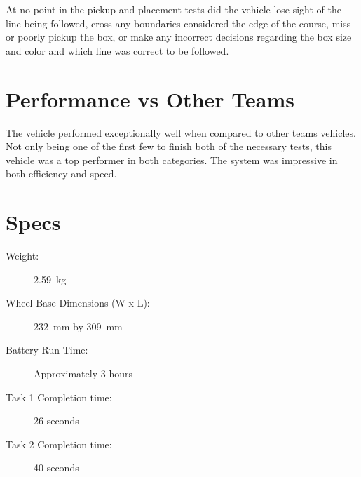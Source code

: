 \documentclass[11pt]{report}
\begin{document}
At no point in the pickup and placement tests did the vehicle lose sight of the line being followed, cross any boundaries considered the edge of the course, miss or poorly pickup the box, or make any incorrect decisions regarding the box size and color and which line was correct to be followed. 
\section{Performance vs Other Teams}
The vehicle performed exceptionally well when compared to other teams vehicles. Not only being one of the first few to finish both of the necessary tests, this vehicle was a top performer in both categories. The system was impressive in both efficiency and speed. 

\section{Specs}
\begin{description}
    \item[Weight:] \SI{2.59}{\kilogram}
    \item[Wheel-Base Dimensions (W x L):] \SI{232}{mm} by \SI{309}{mm}
    \item[Battery Run Time:] Approximately 3 hours
    \item[Task 1 Completion time:] 26 seconds
    \item[Task 2 Completion time:] 40 seconds
\end{description}
\end{document}
